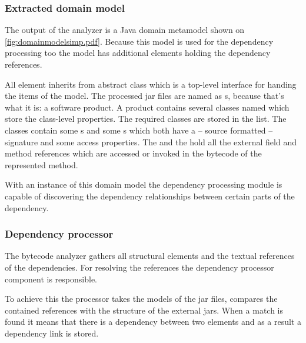 \subsubsection{Extracted domain model}
The output of the analyzer is a Java domain metamodel shown on
\autoref{fig:domainmodelsimp.pdf}.
Because this model is used for the dependency processing too the model has 
additional elements holding the dependency references.

All element inherits from abstract  class which is a top-level
interface for handing the items of the model. The processed jar files are named
as s, because that's what it is: a software product. A product
contains several classes named  which store the class-level
properties. The required classes are stored in the 
list. The classes contain some s and some s which both
have a -- source formatted -- signature and some access properties. The
 and the  hold all the external
field and method references which are accessed or invoked in the bytecode of the
represented method.

With an instance of this domain model the dependency processing module is
capable of discovering the dependency relationships between certain parts of the
dependency.
 

\subsubsection{Dependency processor}
The bytecode analyzer gathers all structural elements and the textual references
of the dependencies. For resolving the references the dependency processor
component is responsible.

To achieve this the processor takes the models of the jar files, compares the
contained references with the structure of the external jars. When a match is
found it means that there is a dependency between two elements and as a result
a dependency link is stored.

